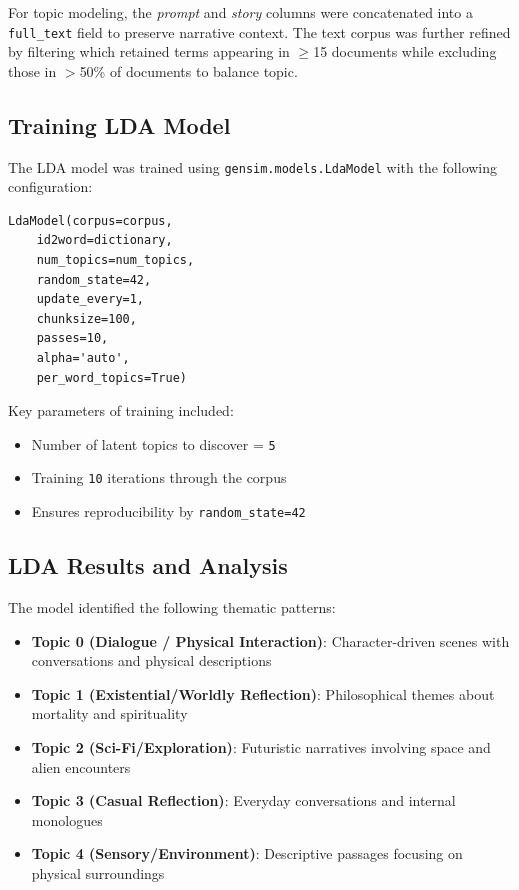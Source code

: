 \documentclass[11pt]{article}
\begin{document}
For topic modeling, the \textit{prompt} and \textit{story} columns were concatenated into a \texttt{full\_text} field to preserve narrative context. The text corpus was further refined by filtering which retained terms appearing in $\geq$15 documents while excluding those in $>$50\% of documents to balance topic.

\subsection{Training LDA Model}
The LDA model was trained using \texttt{gensim.models.LdaModel} with the following configuration:

\begin{verbatim}
LdaModel(corpus=corpus,
    id2word=dictionary,
    num_topics=num_topics,
    random_state=42,
    update_every=1,
    chunksize=100,
    passes=10,
    alpha='auto',
    per_word_topics=True)
\end{verbatim}

Key parameters of training included:
\begin{itemize}
    \item Number of latent topics to discover = \texttt{5}
    \item Training \texttt{10} iterations through the corpus
    \item Ensures reproducibility by \texttt{random\_state=42}
\end{itemize}

\subsection{LDA Results and Analysis}
The model identified the following thematic patterns:

\begin{itemize}
    \item \textbf{Topic 0 (Dialogue / Physical Interaction)}: 
        Character-driven scenes with conversations and physical descriptions
    \item \textbf{Topic 1 (Existential/Worldly Reflection)}: 
        Philosophical themes about mortality and spirituality
    \item \textbf{Topic 2 (Sci-Fi/Exploration)}: 
        Futuristic narratives involving space and alien encounters
    \item \textbf{Topic 3 (Casual Reflection)}: 
        Everyday conversations and internal monologues
    \item \textbf{Topic 4 (Sensory/Environment)}: 
        Descriptive passages focusing on physical surroundings
\end{itemize}
\end{document}
